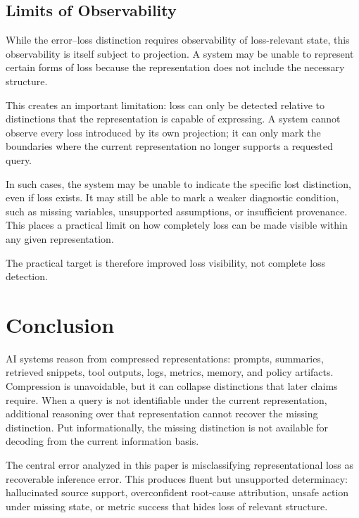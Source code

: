 \documentclass[11pt]{article}
\begin{document}
\subsection{Limits of Observability}

While the error--loss distinction requires observability of loss-relevant state, this observability is itself subject to projection. A system may be unable to represent certain forms of loss because the representation does not include the necessary structure.

This creates an important limitation: loss can only be detected relative to distinctions that the representation is capable of expressing. A system cannot observe every loss introduced by its own projection; it can only mark the boundaries where the current representation no longer supports a requested query.

In such cases, the system may be unable to indicate the specific lost distinction, even if loss exists. It may still be able to mark a weaker diagnostic condition, such as missing variables, unsupported assumptions, or insufficient provenance. This places a practical limit on how completely loss can be made visible within any given representation.

The practical target is therefore improved loss visibility, not complete loss detection.

\section{Conclusion}

AI systems reason from compressed representations: prompts, summaries, retrieved snippets, tool outputs, logs, metrics, memory, and policy artifacts. Compression is unavoidable, but it can collapse distinctions that later claims require. When a query is not identifiable under the current representation, additional reasoning over that representation cannot recover the missing distinction. Put informationally, the missing distinction is not available for decoding from the current information basis.

The central error analyzed in this paper is misclassifying representational loss as recoverable inference error. This produces fluent but unsupported determinacy: hallucinated source support, overconfident root-cause attribution, unsafe action under missing state, or metric success that hides loss of relevant structure.
\end{document}
